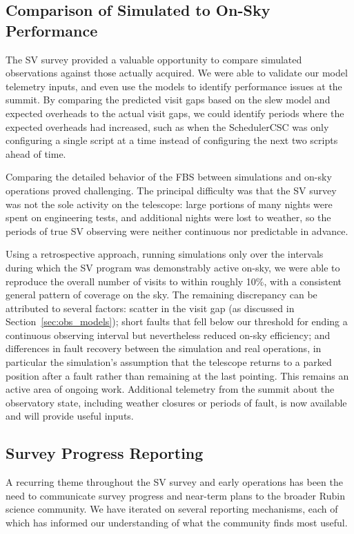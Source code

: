 \subsection{Comparison of Simulated to On-Sky Performance}
\label{sec:comp}

The SV survey provided a valuable opportunity to compare simulated observations
against those actually acquired. We were able to validate our model telemetry
inputs, and even use the models to identify performance issues at the summit. 
By comparing the predicted visit gaps based on the slew model and expected 
overheads to the actual visit gaps, we could identify periods where the expected
overheads had increased, such as when the SchedulerCSC was only configuring 
a single script at a time instead of configuring the next two scripts ahead of time.

Comparing the detailed behavior of the FBS between simulations and on-sky operations proved challenging.
The principal difficulty was that the SV survey was not the sole activity on
the telescope: large portions of many nights were spent on engineering tests,
and additional nights were lost to weather, so the periods of true SV
observing were neither continuous nor predictable in advance.

Using a retrospective approach, running simulations only over the intervals
during which the SV program was demonstrably active on-sky, we were able to
reproduce the overall number of visits to within roughly 10\%, with a consistent
general pattern of coverage on the sky.  The remaining discrepancy can be 
attributed to several factors: scatter in the visit gap (as discussed in
Section~\ref{sec:obs_models}); short faults that fell below our threshold for
ending a continuous observing interval but nevertheless reduced on-sky
efficiency; and differences in fault recovery between the simulation and real
operations, in particular the simulation's assumption that the telescope
returns to a parked position after a fault rather than remaining at the last
pointing.  This remains an active area of ongoing work. 
Additional telemetry from the summit about the observatory state, including 
weather closures or periods of fault, is now available and will provide 
useful inputs.

\subsection{Survey Progress Reporting}

A recurring theme throughout the SV survey and early operations has been the
need to communicate survey progress and near-term plans to the broader Rubin
science community. We have iterated on several reporting mechanisms, each of
which has informed our understanding of what the community finds most useful.

